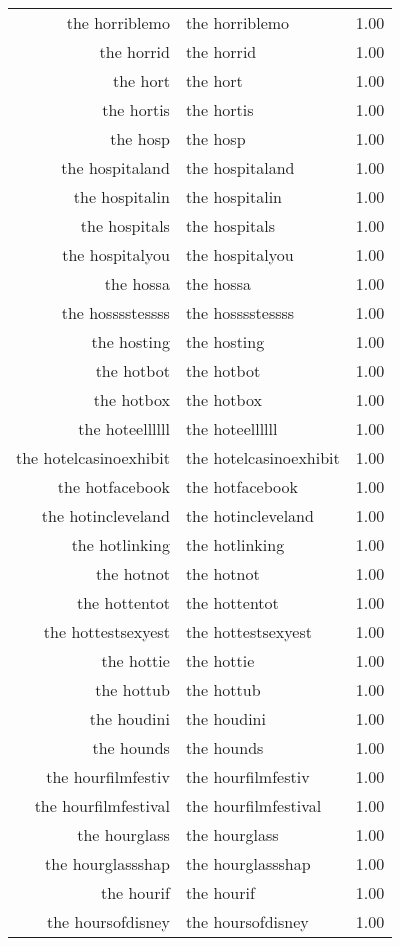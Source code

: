 \begin{table}[ht]
\begin{tabular}{rlr}
  the horriblemo & the horriblemo & 1.00 \\ 
  the horrid & the horrid & 1.00 \\ 
  the hort & the hort & 1.00 \\ 
  the hortis & the hortis & 1.00 \\ 
  the hosp & the hosp & 1.00 \\ 
  the hospitaland & the hospitaland & 1.00 \\ 
  the hospitalin & the hospitalin & 1.00 \\ 
  the hospitals & the hospitals & 1.00 \\ 
  the hospitalyou & the hospitalyou & 1.00 \\ 
  the hossa & the hossa & 1.00 \\ 
  the hosssstessss & the hosssstessss & 1.00 \\ 
  the hosting & the hosting & 1.00 \\ 
  the hotbot & the hotbot & 1.00 \\ 
  the hotbox & the hotbox & 1.00 \\ 
  the hoteellllll & the hoteellllll & 1.00 \\ 
  the hotelcasinoexhibit & the hotelcasinoexhibit & 1.00 \\ 
  the hotfacebook & the hotfacebook & 1.00 \\ 
  the hotincleveland & the hotincleveland & 1.00 \\ 
  the hotlinking & the hotlinking & 1.00 \\ 
  the hotnot & the hotnot & 1.00 \\ 
  the hottentot & the hottentot & 1.00 \\ 
  the hottestsexyest & the hottestsexyest & 1.00 \\ 
  the hottie & the hottie & 1.00 \\ 
  the hottub & the hottub & 1.00 \\ 
  the houdini & the houdini & 1.00 \\ 
  the hounds & the hounds & 1.00 \\ 
  the hourfilmfestiv & the hourfilmfestiv & 1.00 \\ 
  the hourfilmfestival & the hourfilmfestival & 1.00 \\ 
  the hourglass & the hourglass & 1.00 \\ 
  the hourglassshap & the hourglassshap & 1.00 \\ 
  the hourif & the hourif & 1.00 \\ 
  the hoursofdisney & the hoursofdisney & 1.00 \\ 

\end{tabular}
\end{table}
